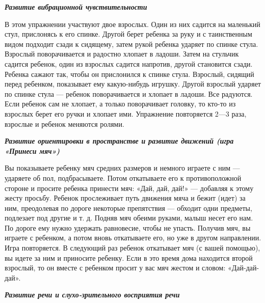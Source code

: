 \documentclass{book}
\renewcommand{\emph}[1]{\textit{#1}}
\begin{document}
\emph{\textbf{Развитие вибрационной чувствительности}}

В этом упражнении участвуют двое взрослых. Один из них садится на
маленький стул, прислонясь к его спинке. Другой берет ребенка за руку и
с таинственным видом подходит сзади к сидящему, затем рукой ребенка
ударяет по спинке стула. Взрослый поворачивается и радостно хлопает в
ладоши. Затем на стульчик садится ребенок, один из взрослых садится
напротив, другой становится сзади. Ребенка сажают так, чтобы он
прислонился к спинке стула. Взрослый, сидящий перед ребенком, показывает
ему какую-нибудь игрушку. Другой взрослый ударяет по спинке стула ---
ребенок поворачивается и хлопает в ладоши. Все радуются. Если ребенок
сам не хлопает, а только поворачивает головку, то кто-то из взрослых
берет его ручки и хлопает ими. Упражнение повторяется 2---3 раза,
взрослые и ребенок меняются ролями.

\emph{\textbf{Развитие ориентировки в пространстве и развитие движений
(игра «Принеси мяч»)}}

Вы показываете ребенку мяч средних размеров и немного играете с ним ---
ударяете об пол, подбрасываете. Потом откатываете его к противоположной
стороне и просите ребенка принести мяч: «Дай, дай, дай!» --- добавляя к
этому жесту просьбу. Ребенок прослеживает путь движения мяча и бежит
(идет) за ним, преодолевая по дороге некоторые препятствия --- обходит
одни предметы, подлезает под другие и т. д. Подняв мяч обеими руками,
малыш несет его нам. По дороге ему нужно удержать равновесие, чтобы не
упасть. Получив мяч, вы играете с ребенком, а потом вновь откатываете
его, но уже в другом направлении. Игра повторяется. В следующий раз
ребенок откатывает мяч (с вашей помощью), вы идете за ним и приносите
ребенку. Если в это время дома находится второй взрослый, то он вместе с
ребенком просит у вас мяч жестом и словом: «Дай-дай-дай».

\emph{\textbf{Развитие речи и слухо-зрительного восприятия речи}}
\end{document}
